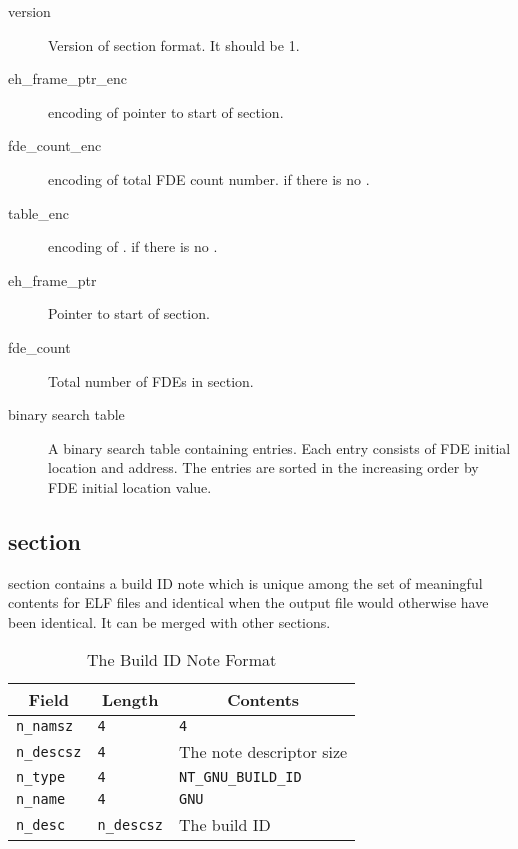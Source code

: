 \begin{description}
 \item[version] Version of  section format.  It
   should be 1.
 \item[eh_frame_ptr_enc]  encoding of pointer to start of
    section.
 \item[fde_count_enc]  encoding of total FDE count number.
    if there is no .
 \item[table_enc]  encoding of .
    if there is no .
 \item[eh_frame_ptr] Pointer to start of  section.
 \item[fde_count] Total number of FDEs in 
   section.
 \item[binary search table] A binary search table containing
    entries. Each entry consists of FDE initial location
   and address.  The entries are sorted in the increasing order by FDE
   initial location value.
\end{description}

\subsection{ section}
\label{sec_build_id}

 section contains a build ID note which is
unique among the set of meaningful contents for ELF files and identical
when the output file would otherwise have been identical.  It can be
merged with other  sections.

\begin{table}[H]
\Hrule
 \caption{The Build ID Note Format}
 \label{format-build_id}
 \begin{center}
  \begin{tabular}[t]{l|l|l}
   \multicolumn{1}{c}{Field}
     & \multicolumn{1}{c}{Length}
       & \multicolumn{1}{c}{Contents} \\
   \hline
   \texttt{n_namsz} & \texttt{4} & \texttt{4} \\
   \texttt{n_descsz} & \texttt{4} & The note descriptor size \\
   \texttt{n_type} & \texttt{4} & \texttt{NT_GNU_BUILD_ID} \\
   \texttt{n_name} & \texttt{4} & \texttt{GNU} \\
   \texttt{n_desc} & \texttt{n_descsz} & The build ID \\
  \end{tabular}
 \end{center}
\Hrule
\end{table}

